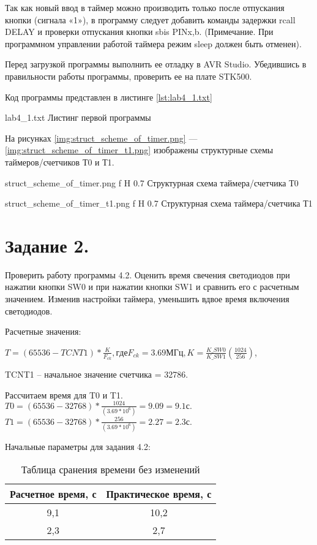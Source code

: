 \documentclass{bmstu}
\begin{document}
Так как новый ввод в таймер можно производить только после отпускания кнопки (сигнала «1»), в программу следует 
добавить команды задержки rcall DELAY и проверки отпускания кнопки sbis PINx,b. (Примечание. При программном 
управлении работой таймера режим sleep должен быть отменен). 

Перед загрузкой программы выполнить ее отладку в AVR Studio. Убедившись в правильности работы программы, проверить 
ее на плате STK500. 

Код программы представлен в листинге \ref{lst:lab4_1.txt}

	{lab4_1.txt}
	{Листинг первой программы}

На рисунках \ref{img:struct_scheme_of_timer.png} --- \ref{img:struct_scheme_of_timer_t1.png} изображены структурные схемы таймеров/счетчиков Т0 и Т1.

	{struct_scheme_of_timer.png}
	{f}
	{H}
	{0.7\textwidth}
	{Структурная схема таймера/счетчика Т0}

	{struct_scheme_of_timer_t1.png}
	{f}
	{H}
	{0.7\textwidth}
	{Структурная схема таймера/счетчика Т1}

\chapter{Задание 2.}

Проверить работу программы 4.2. Оценить время свечения светодиодов при нажатии кнопки SW0 и при нажатии кнопки SW1 и сравнить его с расчетным значением. Изменив настройки таймера, уменьшить вдвое время включения светодиодов.
 
Расчетные значения:

$T = (65536 - TCNT1) * \frac{K}{F_{ck}}, где F_{ck} = 3.69МГц, K = \frac{K\_SW0}{K\_SW1}(\frac{1024}{256})$,

TCNT1 – начальное значение счетчика = 32786.

Рассчитаем время для T0 и T1. \\
$T0 = (65536 - 32 768) * \frac{1024}{(3.69 * 10^6)} = 9.09 = 9.1с. $ \\
$T1 = (65536 - 32 768) * \frac{256}{(3.69 * 10^6)} = 2.27 = 2.3с. $

Начальные параметры для задания 4.2:

\begin{table}[H]
\caption{Таблица сранения времени без изменений}
\label{table:eq_table_1}
\begin{tabular}{| c | c |}
	\hline
		Расчетное время, с & Практическое время, с \\
	\hline
		9,1 & 10,2 \\
	\hline
		2,3 & 2,7 \\
	\hline
\end{tabular}
\end{table}
\end{document}
